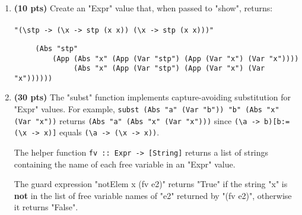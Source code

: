 \documentclass[paper=letter, fontsize=13pt]{article} %
\numberwithin{equation}{section} %
\newif\ifshowanswers\showanswerstrue
\begin{document}
\begin{enumerate}
\newpage
\item \textbf{(10 pts)} Create an "Expr" value that, when passed to "show", returns: \\\\
  \verb|"(\stp -> (\x -> stp (x x)) (\x -> stp (x x)))"|

     \ifshowanswers 
     \begin{verbatim}
     (Abs "stp"
         (App (Abs "x" (App (Var "stp") (App (Var "x") (Var "x")))) 
              (Abs "x" (App (Var "stp") (App (Var "x") (Var "x"))))))
   \end{verbatim}
     \else
           \bigskip
           \bigskip
           \bigskip
           \bigskip
           \bigskip
           \bigskip
           \bigskip
           \bigskip
           \bigskip
           \bigskip
           \bigskip
           \bigskip
           \bigskip
     \fi

  
   \item \textbf{(30 pts)} The "subst" function implements capture-avoiding substitution for "Expr" values. For example,
  \verb|subst (Abs "a" (Var "b")) "b" (Abs "x" (Var "x"))| returns \verb|(Abs "a" (Abs "x" (Var "x")))|
   since \verb|(\a -> b)[b:=(\x -> x)]| equals \verb|(\a -> (\x -> x))|.

     The helper function \verb|fv :: Expr -> [String]|
      returns a list of strings containing the name of each free variable in an "Expr" value.
     
     The guard expression "notElem x (fv e2)" returns "True" if the string "x" is \textbf{not} in the list of free variable names of "e2"
     returned by "(fv e2)", otherwise it returns "False". 


\end{enumerate}
\end{document}
